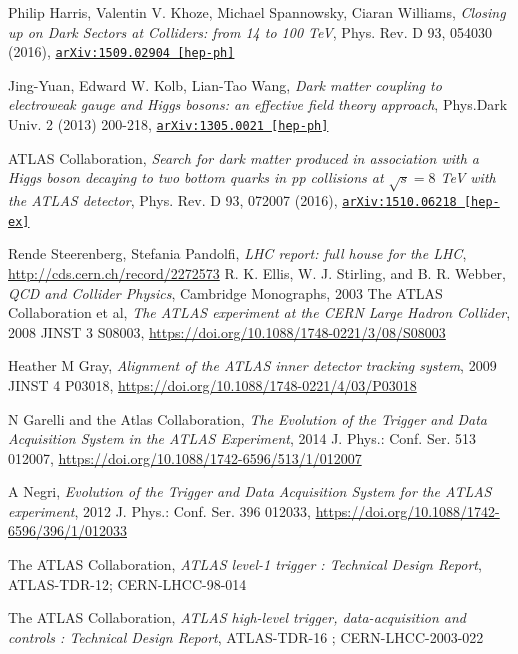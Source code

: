 \documentclass[11pt,a4paper,openright,twoside]{report}
\newcommand{\bibref}[4]{#1, \textit{#2}, #3 #4}
\begin{document}
\begin{thebibliography}{9}
	\bibref{Philip Harris, Valentin V. Khoze, Michael Spannowsky, Ciaran Williams}{Closing up on Dark Sectors at Colliders: from 14 to 100 TeV}{Phys. Rev. D 93, 054030 (2016),}{\href{https://arxiv.org/abs/1509.02904}{\texttt{arXiv:1509.02904 [hep-ph]}}}

	\bibref{Jing-Yuan, Edward W. Kolb, Lian-Tao Wang}{Dark matter coupling to electroweak gauge and Higgs bosons: an effective field theory approach}{Phys.Dark Univ. 2 (2013) 200-218,}{\href{https://arxiv.org/abs/1305.0021}{\texttt{arXiv:1305.0021 [hep-ph]}}}

	\bibref{ATLAS Collaboration}{Search for dark matter produced in association with a Higgs boson decaying to two bottom quarks in pp collisions at $\sqrt{s} = 8$ TeV with the ATLAS detector}{Phys. Rev. D 93, 072007 (2016),}{\href{https://arxiv.org/abs/1510.06218}{\texttt{arXiv:1510.06218 [hep-ex]}}}

	\bibref{Rende Steerenberg, Stefania Pandolfi}{LHC report: full house for the LHC}{ \url{http://cds.cern.ch/record/2272573}}
	
	\bibref{R. K. Ellis, W. J. Stirling, and B. R. Webber}{QCD and Collider Physics}{Cambridge Monographs, 2003}

	\bibref{The ATLAS Collaboration et al}{The ATLAS experiment at the CERN Large Hadron Collider}{2008 JINST 3 S08003,}{\url{https://doi.org/10.1088/1748-0221/3/08/S08003}}

	\bibref{Heather M Gray}{Alignment of the ATLAS inner detector tracking system}{2009 JINST 4 P03018,}{\url{https://doi.org/10.1088/1748-0221/4/03/P03018}}

	\bibref{N Garelli and the Atlas Collaboration}{The Evolution of the Trigger and Data Acquisition System in the ATLAS Experiment}{2014 J. Phys.: Conf. Ser. 513 012007,}{\url{https://doi.org/10.1088/1742-6596/513/1/012007}}

	\bibref{A Negri}{Evolution of the Trigger and Data Acquisition System for the ATLAS experiment}{2012 J. Phys.: Conf. Ser. 396 012033,}{\url{https://doi.org/10.1088/1742-6596/396/1/012033}}

	\bibref{The ATLAS Collaboration}{ATLAS level-1 trigger : Technical Design Report}{ATLAS-TDR-12;}{CERN-LHCC-98-014}

	\bibref{The ATLAS Collaboration}{ATLAS high-level trigger, data-acquisition and controls : Technical Design Report}{ATLAS-TDR-16 ;}{CERN-LHCC-2003-022}


\end{thebibliography}
\end{document}
